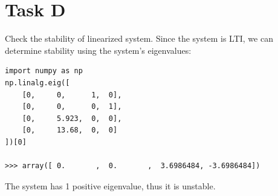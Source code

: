\documentclass[12pt,letterpaper]{article}
\begin{document}
\newpage
\section*{Task D}
\label{Q:D}
    Check the stability of linearized system.
    \newline \newline
    Since the system is LTI, we can determine stability using the system's eigenvalues:
    \begin{verbatim}
import numpy as np
np.linalg.eig([
    [0,     0,      1,  0], 
    [0,     0,      0,  1],
    [0,     5.923,  0,  0],
    [0,     13.68,  0,  0]
])[0]

>>> array([ 0.       ,  0.       ,  3.6986484, -3.6986484])
    \end{verbatim}
    The system has 1 positive eigenvalue, thus it is unstable.
\end{document}
